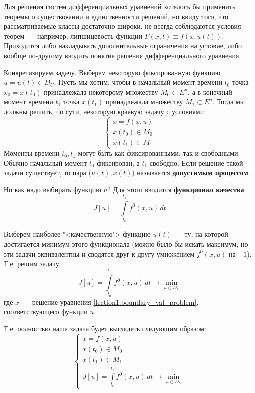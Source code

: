 Для решения систем дифференциальных уравнений хотелось бы применить теоремы о существовании и единственности решений, но ввиду того,
что рассматриваемые классы достаточно широки, не всегда соблюдаются условия теорем~--- например, липшицевость функции $F(x, t) \equiv f(x, u(t))$.
Приходится либо накладывать дополнительные ограничения на условие, либо вообще по-другому вводить понятие решения дифференциального уравнения.

Конкретизируем задачу. 
Выберем некоторую фиксированную функцию $u = u(t) \in D_U$.
Пусть мы хотим, чтобы в начальный момент времени $t_0$ точка $x_0 = x(t_0)$ принадлежала некоторому множеству $M_0 \subset E^n$, 
а в конечный момент времени $t_1$ точка $x(t_1)$ принадлежала множеству $M_1 \subset E^n$.
Тогда мы должны решить, по сути, некоторую краевую задачу с условиями
\begin{equation}
    \label{lection1:boundary_val_problem}
    \begin{cases}
        \dot{x} = f(x, u) \\
        x(t_0) \in M_0 \\
        x(t_1) \in M_1
    \end{cases}
\end{equation}
Моменты времени $t_0, t_1$ могут быть как фиксированными, так и свободными.
Обычно начальный момент $t_0$ фиксирован, а $t_1$ свободно.
Если решение такой задачи существует, то пара $\bigl(u(t), x(t)\bigr)$ называется \textbf{допустимым процессом}.

Но как надо выбирать функцию $u$?
Для этого вводится \textbf{функционал качества}:
\begin{equation}
    J[u] = \int\limits_{t_0}^{t_1} f^0(x, u) \, dt
\end{equation}

Выберем наиболее "<качественную"> функцию $u(t)$~--- ту, на которой достигается минимум этого функционала 
(можно было бы искать максимум, но эти задачи эквивалентны и сводятся друг к другу умножением $f^0(x, u)$ на $-1$).
Т.е. решим задачу 
\begin{equation}
    J[u] = \int\limits_{t_0}^{t_1} f^0(x, u) \, dt \rightarrow \min\limits_{u \in D_U}
\end{equation}
где $x$~--- решение уравнения \ref{lection1:boundary_val_problem}, соответствующего функции $u$.

Т.е. полностью наша задача будет выглядеть следующим образом:
\begin{equation}
    \label{lection1:main_problem}
    \begin{cases}
        \dot{x} = f(x, u) \\
        x(t_0) \in M_0 \\
        x(t_1) \in M_1 \\
        \displaystyle J[u] = \int\limits_{t_0}^{t_1} f^0(x, u) \, dt \rightarrow \min\limits_{u \in D_U}
    \end{cases}
\end{equation}

